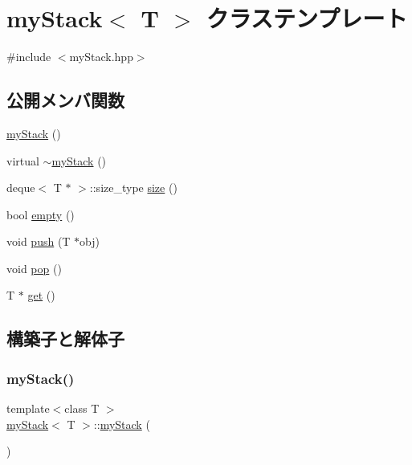 \hypertarget{classmy_stack}{}\section{my\+Stack$<$ T $>$ クラステンプレート}
\label{classmy_stack}


{\ttfamily \#include $<$my\+Stack.\+hpp$>$}

\subsection*{公開メンバ関数}
\begin{DoxyCompactItemize}
\item 
\hyperlink{classmy_stack_a78b5f56a20f29b1b767cb7be745f29b5}{my\+Stack} ()
\item 
virtual \hyperlink{classmy_stack_a75286e7b2439d03bce4d1c9883f8a81b}{$\sim$my\+Stack} ()
\item 
deque$<$ T $\ast$ $>$\+::size\+\_\+type \hyperlink{classmy_stack_a565111195b278e48d10e12c0e5d0128d}{size} ()
\item 
bool \hyperlink{classmy_stack_a1f330f063efc09879b12d039ae195b3a}{empty} ()
\item 
void \hyperlink{classmy_stack_ab44aa707db5bce9315ed3bc32ccac11e}{push} (T $\ast$obj)
\item 
void \hyperlink{classmy_stack_ac5c13cd1329d85cdb0e9870d24230324}{pop} ()
\item 
T $\ast$ \hyperlink{classmy_stack_aabbc8ac3b85d2ecd1b1fab78c4abf3dc}{get} ()
\end{DoxyCompactItemize}


\subsection{構築子と解体子}
\mbox{\label{classmy_stack_a78b5f56a20f29b1b767cb7be745f29b5}} 
\subsubsection{\texorpdfstring{my\+Stack()}{myStack()}}
{\footnotesize\ttfamily template$<$class T $>$ \\
\hyperlink{classmy_stack}{my\+Stack}$<$ T $>$\+::\hyperlink{classmy_stack}{my\+Stack} (\begin{DoxyParamCaption}{ }\end{DoxyParamCaption})\hspace{0.3cm}{\ttfamily [inline]}}

